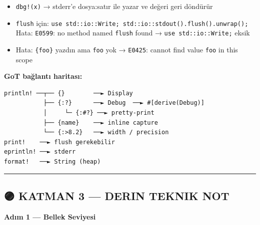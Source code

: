 \documentclass[12pt,a4paper]{article}
\newenvironment{Shaded}{}{}
\newcommand{\CommentTok}[1]{\textcolor[rgb]{0.38,0.63,0.69}{\textit{#1}}}
\newcommand{\DataTypeTok}[1]{\textcolor[rgb]{0.56,0.13,0.00}{#1}}
\newcommand{\FunctionTok}[1]{\textcolor[rgb]{0.02,0.16,0.49}{#1}}
\newcommand{\KeywordTok}[1]{\textcolor[rgb]{0.00,0.44,0.13}{\textbf{#1}}}
\newcommand{\NormalTok}[1]{#1}
\newcommand{\OperatorTok}[1]{\textcolor[rgb]{0.40,0.40,0.40}{#1}}
\begin{document}
\begin{itemize}
\begin{Shaded}
\begin{Highlighting}[]
\NormalTok{\#}\OperatorTok{[}\FunctionTok{derive}\OperatorTok{(}\NormalTok{Debug}\OperatorTok{)]}
\KeywordTok{struct}\NormalTok{ Point }\OperatorTok{\{}\NormalTok{ x}\OperatorTok{:} \DataTypeTok{i32}\OperatorTok{,}\NormalTok{ y}\OperatorTok{:} \DataTypeTok{i32} \OperatorTok{\}}
\CommentTok{// \{:?\}  → Point \{ x: 1, y: 2 \}}
\end{Highlighting}
\end{Shaded}


  Hata: \texttt{E0277}: \texttt{Point} doesn't implement \texttt{std::fmt::Display} (\texttt{\{\}} kullandın) veya \texttt{Debug} (derive unuttun)
\item
  \texttt{dbg!(x)} → stderr'e dosya:satır ile yazar ve değeri geri döndürür
\item
  \texttt{flush} için: \texttt{use\ std::io::Write;\ std::io::stdout().flush().unwrap();}
  Hata: \texttt{E0599}: no method named \texttt{flush} found → \texttt{use\ std::io::Write;} eksik
\item
  Hata: \texttt{\{foo\}} yazdın ama \texttt{foo} yok → \texttt{E0425}: cannot find value \texttt{foo} in this scope
\end{itemize}

\textbf{GoT bağlantı haritası:}

\begin{verbatim}
println! ──┬── {}        ──► Display
           ├── {:?}      ──► Debug  ──► #[derive(Debug)]
           │     └─ {:#?} ──► pretty-print
           ├── {name}    ──► inline capture
           └── {:>8.2}   ──► width / precision
print!    ──► flush gerekebilir
eprintln! ──► stderr
format!   ──► String (heap)
\end{verbatim}

\begin{center}\rule{0.5\linewidth}{0.5pt}\end{center}

\subsection{🟣 KATMAN 3 --- DERIN TEKNIK NOT}\label{katman-3-—-derin-teknik-not-1}

\textbf{Adım 1 --- Bellek Seviyesi}
\end{document}
